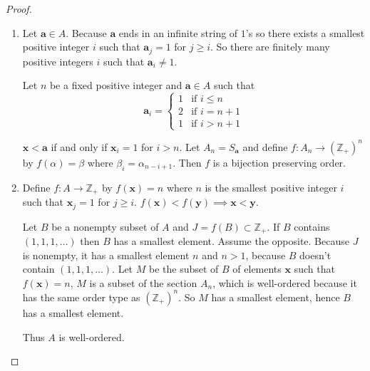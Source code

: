 \begin{proof}
    \begin{enumerate}[label={(\alph*)}]
        \item Let $\mathbf{a}\in A$. Because $\mathbf{a}$ ends in an infinite string of $1$'s so there exists a smallest positive integer $i$ such that $\mathbf{a}_{j} = 1$ for $j\geq i$. So there are finitely many positive integers $i$ such that $\mathbf{a}_{i}\ne 1$.

              Let $n$ be a fixed positive integer and $\mathbf{a}\in A$ such that
              \[
                  \mathbf{a}_{i} = \begin{cases}
                      1 & \text{if $i\leq n$}   \\
                      2 & \text{if $i = n + 1$} \\
                      1 & \text{if $i > n + 1$}
                  \end{cases}
              \]

              $\mathbf{x} < \mathbf{a}$ if and only if $\mathbf{x}_{i} = 1$ for $i > n$. Let $A_{n} = S_{\mathbf{a}}$ and define $f: A_{n}\to {(\mathbb{Z}_{+})}^{n}$ by $f(\alpha) = \beta$ where $\beta_{i} = \alpha_{n-i+1}$. Then $f$ is a bijection preserving order.
        \item Define $f: A\to \mathbb{Z}_{+}$ by $f(\mathbf{x}) = n$ where $n$ is the smallest positive integer $i$ such that $\mathbf{x}_{j} = 1$ for $j\geq i$. $f(\mathbf{x}) < f(\mathbf{y})\implies \mathbf{x} < \mathbf{y}$.

              Let $B$ be a nonempty subset of $A$ and $J = f(B)\subset \mathbb{Z}_{+}$. If $B$ contains $(1, 1, 1, \ldots)$ then $B$ has a smallest element. Assume the opposite. Because $J$ is nonempty, it has a smallest element $n$ and $n > 1$, because $B$ doesn't contain $(1, 1, 1, \ldots)$. Let $M$ be the subset of $B$ of elements $\mathbf{x}$ such that $f(\mathbf{x}) = n$, $M$ is a subset of the section $A_{n}$, which is well-ordered because it has the same order type as ${(\mathbb{Z}_{+})}^{n}$. So $M$ has a smallest element, hence $B$ has a smallest element.

              Thus $A$ is well-ordered.
    \end{enumerate}
\end{proof}


